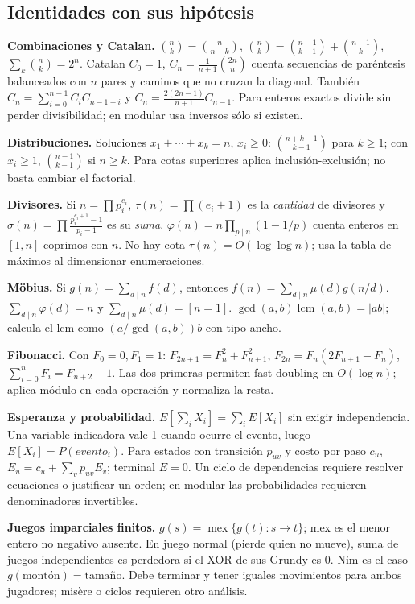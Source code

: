 \subsection{Identidades con sus hipótesis}
\textbf{Combinaciones y Catalan.} $\binom nk=\binom n{n-k}$,
$\binom nk=\binom{n-1}{k-1}+\binom{n-1}k$, $\sum_k\binom nk=2^n$.
Catalan $C_0=1$, $C_n=\frac1{n+1}\binom{2n}n$ cuenta secuencias de paréntesis balanceados con $n$ pares y caminos que no cruzan la diagonal. También
$C_n=\sum_{i=0}^{n-1}C_iC_{n-1-i}$ y $C_n=\frac{2(2n-1)}{n+1}C_{n-1}$.
Para enteros exactos divide sin perder divisibilidad; en modular usa inversos sólo si existen.

\textbf{Distribuciones.} Soluciones $x_1+\cdots+x_k=n$, $x_i\ge0$:
$\binom{n+k-1}{k-1}$ para $k\ge1$; con $x_i\ge1$, $\binom{n-1}{k-1}$ si $n\ge k$. Para cotas superiores aplica inclusión-exclusión; no basta cambiar el factorial.

\textbf{Divisores.} Si $n=\prod p_i^{e_i}$,
$\tau(n)=\prod(e_i+1)$ es la \emph{cantidad} de divisores y
$\sigma(n)=\prod\frac{p_i^{e_i+1}-1}{p_i-1}$ es su \emph{suma}.
$\varphi(n)=n\prod_{p\mid n}(1-1/p)$ cuenta enteros en $[1,n]$ coprimos con $n$.
No hay cota $\tau(n)=O(\log\log n)$; usa la tabla de máximos al dimensionar enumeraciones.

\textbf{Möbius.} Si $g(n)=\sum_{d\mid n}f(d)$, entonces
$f(n)=\sum_{d\mid n}\mu(d)g(n/d)$.
$\sum_{d\mid n}\varphi(d)=n$ y $\sum_{d\mid n}\mu(d)=[n=1]$.
$\gcd(a,b)\operatorname{lcm}(a,b)=|ab|$; calcula el lcm como $(a/\gcd(a,b))b$ con tipo ancho.

\textbf{Fibonacci.} Con $F_0=0,F_1=1$:
$F_{2n+1}=F_n^2+F_{n+1}^2$,
$F_{2n}=F_n(2F_{n+1}-F_n)$,
$\sum_{i=0}^nF_i=F_{n+2}-1$.
Las dos primeras permiten fast doubling en $O(\log n)$; aplica módulo en cada operación y normaliza la resta.

\textbf{Esperanza y probabilidad.} $E[\sum_iX_i]=\sum_iE[X_i]$ sin exigir independencia.
Una variable indicadora vale 1 cuando ocurre el evento, luego $E[X_i]=P(evento_i)$.
Para estados con transición $p_{uv}$ y costo por paso $c_u$,
$E_u=c_u+\sum_vp_{uv}E_v$; terminal $E=0$.
Un ciclo de dependencias requiere resolver ecuaciones o justificar un orden; en modular las probabilidades requieren denominadores invertibles.

\textbf{Juegos imparciales finitos.} $g(s)=\operatorname{mex}\{g(t):s\to t\}$; mex es el menor entero no negativo ausente.
En juego normal (pierde quien no mueve), suma de juegos independientes es perdedora si el XOR de sus Grundy es 0. Nim es el caso $g(\text{montón})=\text{tamaño}$.
Debe terminar y tener iguales movimientos para ambos jugadores; misère o ciclos requieren otro análisis.
